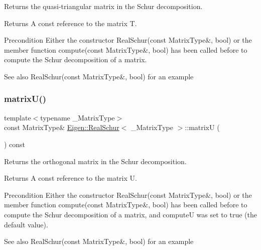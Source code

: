 Returns the quasi-\/triangular matrix in the Schur decomposition. 

\begin{DoxyReturn}{Returns}
A const reference to the matrix T.
\end{DoxyReturn}
\begin{DoxyPrecond}{Precondition}
Either the constructor Real\+Schur(const Matrix\+Type\&, bool) or the member function compute(const Matrix\+Type\&, bool) has been called before to compute the Schur decomposition of a matrix.
\end{DoxyPrecond}
\begin{DoxySeeAlso}{See also}
Real\+Schur(const Matrix\+Type\&, bool) for an example 
\end{DoxySeeAlso}
\mbox{\label{class_eigen_1_1_real_schur_a85622ccbecff99c8933d21f0a22b22bb}} 
\subsubsection{\texorpdfstring{matrixU()}{matrixU()}}
{\footnotesize\ttfamily template$<$typename \+\_\+\+Matrix\+Type$>$ \\
const Matrix\+Type\& \mbox{\hyperlink{class_eigen_1_1_real_schur}{Eigen\+::\+Real\+Schur}}$<$ \+\_\+\+Matrix\+Type $>$\+::matrixU (\begin{DoxyParamCaption}{ }\end{DoxyParamCaption}) const\hspace{0.3cm}{\ttfamily [inline]}}



Returns the orthogonal matrix in the Schur decomposition. 

\begin{DoxyReturn}{Returns}
A const reference to the matrix U.
\end{DoxyReturn}
\begin{DoxyPrecond}{Precondition}
Either the constructor Real\+Schur(const Matrix\+Type\&, bool) or the member function compute(const Matrix\+Type\&, bool) has been called before to compute the Schur decomposition of a matrix, and {\ttfamily computeU} was set to true (the default value).
\end{DoxyPrecond}
\begin{DoxySeeAlso}{See also}
Real\+Schur(const Matrix\+Type\&, bool) for an example 
\end{DoxySeeAlso}
\mbox{\label{class_eigen_1_1_real_schur_ad189e8776ee20a12046694f98b354322}} 
